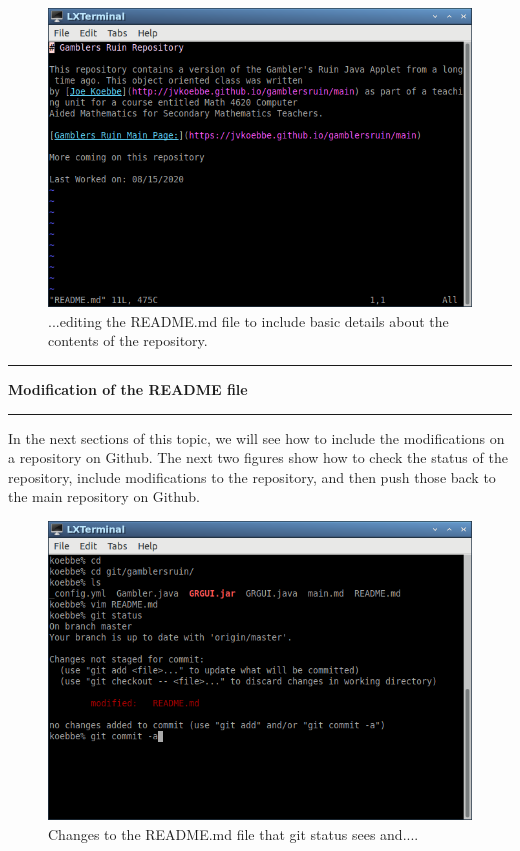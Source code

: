 \documentclass[10pt,fleqn]{article}
\begin{document}
\vfill
\begin{figure}[h]
\centering
\includegraphics[width=5.0in]{../images/git_12.png}
\caption{...editing the README.md file to include basic details about the
contents of the repository.}
\end{figure}
\eject
\vskip0.1in\hrule\vskip0.1in\noindent
{\bf Modification of the README file} 
\vskip0.1in\hrule\vskip0.1in\noindent
In the next sections of this topic, we will see how to include the modifications
on a repository on Github. The next two figures show how to check the status of
the repository, include modifications to the repository, and then push those
back to the main repository on Github.
\vfill
\begin{figure}[h]
\centering
\includegraphics[width=5.0in]{../images/git_13.png}
\caption{Changes to the README.md file that git status sees and....}
\end{figure}
\end{document}
